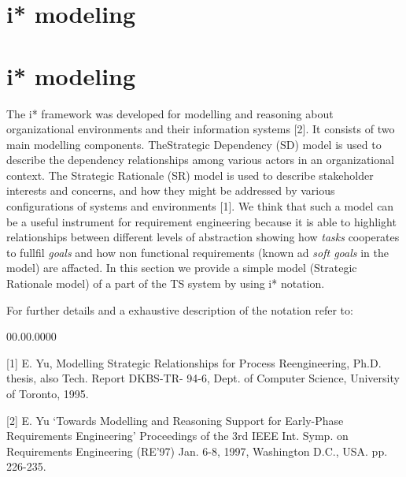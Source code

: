 \section{i* modeling} \label{sec:Appendix1}


\section*{i{*} modeling}

The i{*} framework was developed for modelling and reasoning about
organizational environments and their information systems {[}2{]}.
It consists of two main modelling components. TheStrategic Dependency
(SD) model is used to describe the dependency relationships among
various actors in an organizational context. The Strategic Rationale
(SR) model is used to describe stakeholder interests and concerns,
and how they might be addressed by various configurations of systems
and environments {[}1{]}. We think that such a model can be a useful
instrument for requirement engineering because it is able to highlight
relationships between different levels of abstraction showing how
\emph{tasks} cooperates to fullfil \emph{goals} and how non functional
requirements (known ad \emph{soft goals} in the model) are affacted.
In this section we provide a simple model (Strategic Rationale model)
of a part of the TS system by using i{*} notation.

For further details and a exhaustive description of the notation refer
to:
\begin{lyxlist}{00.00.0000}
\item [{{[}1{]}}] E. Yu, Modelling Strategic Relationships for Process
Reengineering, Ph.D. thesis, also Tech. Report DKBS-TR- 94-6, Dept.
of Computer Science, University of Toronto, 1995.
\item [{{[}2{]}}] E. Yu `Towards Modelling and Reasoning Support for Early-Phase
Requirements Engineering' Proceedings of the 3rd IEEE Int. Symp. on
Requirements Engineering (RE'97) Jan. 6-8, 1997, Washington D.C.,
USA. pp. 226-235. 
\end{lyxlist}
\clearpage{}

